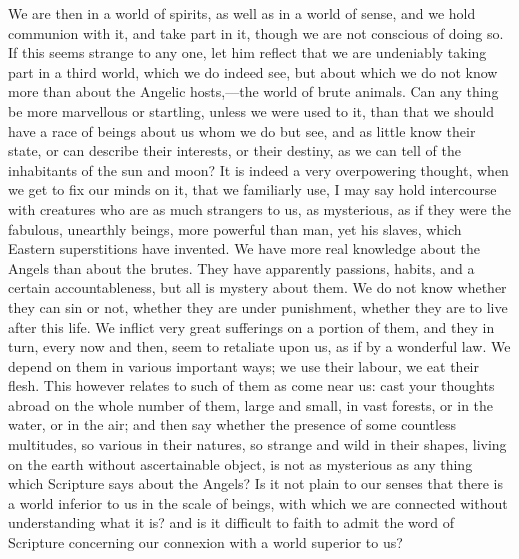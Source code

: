 We are then in a world of spirits, as well as in a world of sense,
and we hold communion with it, and take part in it, though we are not
conscious of doing so. If this seems strange to any one, let him
reflect that we are undeniably taking part in a third world, which we
do indeed see, but about which we do not know more than about the
Angelic hosts,—the world of brute animals. Can any thing be more
marvellous or startling, unless we were used to it, than that we
should have a race of beings about us whom we do but see, and as
little know their state, or can describe their interests, or their
destiny, as we can tell of the inhabitants of the sun and moon? It is
indeed a very overpowering thought, when we get to fix our minds on
it, that we familiarly use, I may say hold intercourse with creatures
who are as much strangers to us, as mysterious, as if they were the
fabulous, unearthly beings, more powerful than man, yet his slaves,
which Eastern superstitions have invented. We have more real knowledge
about the Angels than about the brutes. They have apparently passions,
habits, and a certain accountableness, but all is mystery about them.
We do not know whether they can sin or not, whether they are under
punishment, whether they are to live after this life. We inflict very
great sufferings on a portion of them, and they in turn, every now and
then, seem to retaliate upon us, as if by a wonderful law. We depend
on them in various important ways; we use their labour, we eat their
flesh. This however relates to such of them as come near us: cast your
thoughts abroad on the whole number of them, large and small, in vast
forests, or in the water, or in the air; and then say whether the
presence of some countless multitudes, so various in their natures, so
strange and wild in their shapes, living on the earth without
ascertainable object, is not as mysterious as any thing which
Scripture says about the Angels? Is it not plain to our senses that
there is a world inferior to us in the scale of beings, with which we
are connected without understanding what it is? and is it difficult to
faith to admit the word of Scripture concerning our connexion with a
world superior to us?

